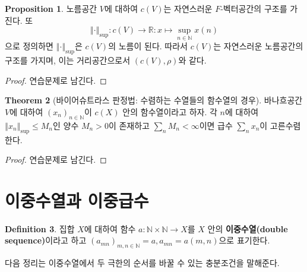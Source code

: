 \documentclass[11pt]{book}
\numberwithin{equation}{chapter}
\def\NN{\mathbb{N}}
\def\RR{\mathbb{R}}
\newcommand{\norm}[1]{\left\Vert#1\right\Vert}
\theoremstyle{definition}
\newtheorem{thm}{Theorem}[section]
\newtheorem{prop}[thm]{Proposition}
\newtheorem{defn}[thm]{Definition}
\begin{document}
\begin{prop}
    노름공간 \(V\)에 대하여 \(c(V)\)는 자연스러운 \(F\)-벡터공간의 구조를 가진다. 또
    \[
    \norm{\cdot}_{\sup} : c(V) \to \RR : x \mapsto \sup_{n \in \NN} x(n)    
    \]
    으로 정의하면 \(\norm{\cdot}_{\sup}\)은 \(c(V)\)의 노름이 된다. 따라서 \(c(V)\)는 자연스러운 노름공간의 구조를 가지며, 이는 거리공간으로서 \((c(V), \rho)\)와 같다.
\end{prop}
\begin{proof}
    연습문제로 남긴다.
\end{proof}

\begin{thm}[바이어슈트라스 판정법: 수렴하는 수열들의 함수열의 경우]
    바나흐공간 \(V\)에 대하여 \((x_n)_{n \in \NN}\)이 \(c(X)\) 안의 함수열이라고 하자. 각 \(n\)에 대하여 \(\norm{x_n}_{\sup} \le M_n\)인 양수 \(M_n > 0\)이 존재하고 \(\sum_n M_n < \infty\)이면 급수 \(\sum_n x_n\)이 고른수렴한다.
\end{thm}
\begin{proof}
    연습문제로 남긴다.
\end{proof}

\section{이중수열과 이중급수}

\begin{defn}
    집합 \(X\)에 대하여 함수 \(a : \NN \times \NN \to X\)를 \(X\) 안의 \textbf{이중수열(double sequence)}이라고 하고 \((a_{mn})_{m, n \in \NN} = a, a_{mn} = a(m, n)\)으로 표기한다.
\end{defn}

다음 정리는 이중수열에서 두 극한의 순서를 바꿀 수 있는 충분조건을 말해준다.
\end{document}
